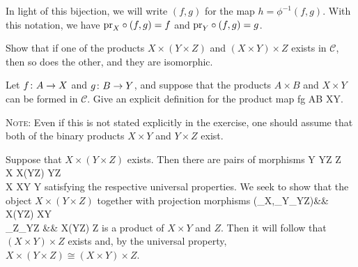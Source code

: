 In light of this bijection, we will write $(f,g)$ for the map $h=\phi^{-1}(f,g)$. With this notation, we have $\mathrm{pr}_X\circ(f,g)=f$ and $\mathrm{pr}_Y\circ(f,g)=g$.
\es

\bx
\ben[label=(\alph*)]
\item Show that if one of the products $X\times(Y\times Z)$ and $(X\times Y)\times Z$ exists in $\mathcal{C}$, then so does the other, and they are isomorphic.
\item Let $f\colon A\to X$ and $g\colon B\to Y$, and suppose that the products $A\times B$ and $X\times Y$ can be formed in $\mathcal{C}$. Give an explicit definition for the product map
\bse
f\times g \cl A\times B \to X\times Y.
\ese
\een
\ex

\bs
{\scshape Note}: Even if this is not stated explicitly in the exercise, one should assume that both of the binary products $X\times Y$ and $Y\times Z$ exist. 
\ben[label=(\alph*)]
\item Suppose that $X\times(Y\times Z)$ exists. Then there are pairs of morphisms
Y  Y\times Z  Z\\
X  X\times (Y\times Z)  Y\times Z\\
X  X\times Y  Y
\ei
satisfying the respective universal properties. We seek to show that the object $X\times(Y\times Z)$ together with projection morphisms
(\pr_X,\pr_Y\circ\pr_{Y\times Z})\cl && X\times(Y\times Z) \longrightarrow X\times Y\\ 
\pr_Z\circ\pr_{Y\times Z} \cl &&  X\times(Y\times Z) \longrightarrow Z
\ei
is a product of $X\times Y$ and $Z$. Then it will follow that $(X\times Y)\times Z$ exists and, by the universal property, $X\times (Y\times Z)\cong (X\times Y)\times Z$.


